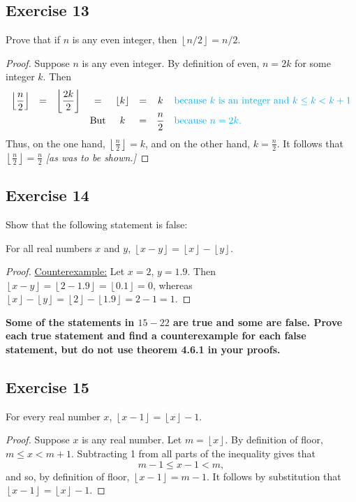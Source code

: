 \documentclass[14pt]{extarticle}
\newcommand{\dps}{\displaystyle}
\newcommand{\cy}{\color{cyan}}
\newcommand{\floor}[1]{{\left\lfloor#1\right\rfloor}}
\begin{document}
\subsection{Exercise 13}
Prove that if $n$ is any even integer, then $\floor{n/2} = n/2$.

\begin{proof}
Suppose $n$ is any even integer. By definition of even, $n = 2k$ for some integer $k$. Then
\[
\begin{array}{cccccccl}
\dps\floor{\frac{n}{2}} &=& \dps\floor{\frac{2k}{2}} &=& \dps\floor{k} &=& k & \text{\cy because $k$ is an integer and $k \leq k < k+1$} \\
& & & \text{But} & k &=& \dps\frac{n}{2} & \text{\cy because $n = 2k$.}\\
\end{array}
\]
Thus, on the one hand, $\floor{\frac{n}{2}} = k$, and on the other hand, $k = \frac{n}{2}$. It follows that $\floor{\frac{n}{2}} = \frac{n}{2}$ {\it [as was to be shown.]}
\end{proof}

\subsection{Exercise 14}
Show that the following statement is false:

For all real numbers $x$ and $y$, $\floor{x-y} = \floor{x} - \floor{y}$.

\begin{proof}
\underline{Counterexample:} Let $x = 2$, $y = 1.9$. Then $\floor{x-y} = \floor{2-1.9} = \floor{0.1} = 0$, whereas $\floor{x} - \floor{y} = \floor{2} - \floor{1.9} = 2-1 = 1$.
\end{proof}

{\bf \cy Some of the statements in $15-22$ are true and some are false. Prove each true statement and find a counterexample for each false statement, but do not use theorem 4.6.1 in your proofs.}

\subsection{Exercise 15}
For every real number $x$, $\floor{x - 1} = \floor{x} - 1$.

\begin{proof}
Suppose $x$ is any real number. Let $m = \floor{x}$. By definition of floor,\\ $m \leq x < m + 1$. Subtracting 1 from
all parts of the inequality gives that
\[
m - 1 \leq x - 1 < m,
\]
and so, by definition of floor, $\floor{x - 1} = m - 1$. It follows by substitution that\\ $\floor{x - 1} = \floor{x} - 1$.

\end{proof}
\end{document}
